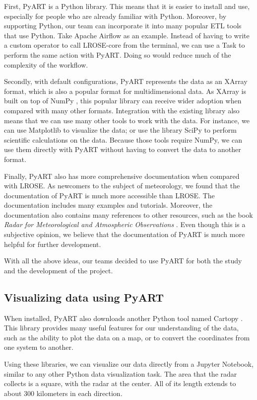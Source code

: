 First, PyART is a Python library.
This means that it is easier to install and use, especially for people who are already familiar with Python.
Moreover, by supporting Python, our team can incorporate it into many popular ETL tools that use Python.
Take Apache Airflow as an example. Instead of having to write a custom operator to call LROSE-core from the terminal,
we can use a Task to perform the same action with PyART. Doing so would reduce much of the complexity of the workflow.

Secondly, with default configurations, PyART represents the data as an XArray \cite{hoyer2017xarray} format,
which is also a popular format for multidimensional data. As XArray is built on top of NumPy \cite{harris2020array},
this popular library can receive wider adoption when compared with many other formats.
Integration with the existing library also means that we can use many other tools to work with the data.
For instance, we can use Matplotlib to visualize the data;
or use the library SciPy \cite{2020SciPy-NMeth} to perform scientific calculations on the data. Because those tools require NumPy,
we can use them directly with PyART without having to convert the data to another format.

Finally, PyART also has more comprehensive documentation when compared with LROSE.
As newcomers to the subject of meteorology, we found that the documentation of PyART is much more accessible than LROSE.
The documentation includes many examples and tutorials. Moreover, the documentation also contains many references to other resources,
such as the book \textit{Radar for Meteorological and Atmospheric Observations} \cite{2022Weather}.
Even though this is a subjective opinion, we believe that the documentation of PyART is much more helpful for further development.

With all the above ideas, our teams decided to use PyART for both the study and the development of the project.

\subsection{Visualizing data using PyART}
When installed, PyART also downloads another Python tool named Cartopy \cite{Cartopy}. This library provides many useful features
for our understanding of the data, such as the ability to plot the data on a map, or to convert the coordinates from one system to another.

Using these libraries, we can visualize our data directly from a Jupyter Notebook, similar to any other Python data visualization task.
The area that the radar collects is a square, with the radar at the center. All of its length extends to about 300 kilometers in each direction.


